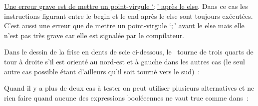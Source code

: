 \underline{Une erreur grave est de mettre un point-virgule 
`{\idt $;$}' après le {\mcl else}}. \hfill Dans ce cas les instructions figurant entre le {\mcl begin} et
le {\mcl end} après le {\mcl else} sont toujours exécutées. C'est aussi une erreur que
de mettre un point-virgule `{\idt $;$}' \underline{avant} le {\mcl else} mais elle n'est pas
très grave car elle est signalée par le com\-pi\-la\-teur.

Dans le dessin de la frise en dents de scie ci-dessous, le \robot\ tourne de trois quarts de tour à droite 
s'il est orienté au nord-est et à gauche dans les autres cas (le seul autre cas possible étant d'ailleurs
qu'il soit tourné vers le sud)~:

\vspace{0.4cm}
 {\raggedright 
 
 }
 
 Quand il y a plus de deux cas à tester on peut utiliser plusieurs alternatives et ne rien faire
 quand aucune des expressions booléeennes ne vaut {\idt true} comme dans~:
 
